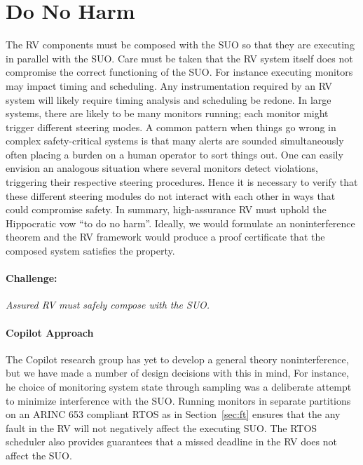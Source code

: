 \section{Do No Harm} \label{sec:noninter} The RV components must be
composed with the SUO so that they are executing in parallel with the
SUO.  Care must be taken that the RV system itself does not compromise
the correct functioning of the SUO.  For instance executing monitors
may impact timing and scheduling. Any instrumentation required by an
RV system will likely require timing analysis and scheduling be
redone. In large systems, there are likely to be many monitors
running; each monitor might trigger different steering modes. A common
pattern when things go wrong in complex safety-critical systems is
that many alerts are sounded simultaneously often placing a burden on
a human operator to sort things out.  One can easily envision an
analogous situation where several monitors detect violations,
triggering their respective steering procedures. Hence it is necessary
to verify that these different steering modules do not interact with
each other in ways that could compromise safety. In summary,
high-assurance RV must uphold the Hippocratic vow ``to do no harm''.
Ideally, we would formulate an noninterference theorem and the RV
framework would produce a proof certificate that the composed system
satisfies the property.


\paragraph{Challenge:} \emph{Assured RV must safely compose with the
  SUO.}

\paragraph{Copilot Approach}  
The Copilot research group has yet to develop a general theory
noninterference, but we have made a number of design decisions with
this in mind, For instance, he choice of monitoring system state
through sampling was a deliberate attempt to minimize interference
with the SUO. Running monitors in separate partitions on an ARINC 653
compliant RTOS as in Section~\ref{sec:ft} ensures that the any fault
in the RV will not negatively affect the executing SUO. The RTOS
scheduler also provides guarantees that a missed deadline in the RV
does not affect the SUO.

 

